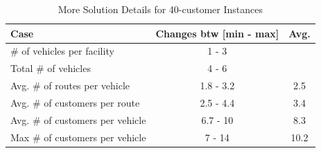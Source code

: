 \begin{table}[!htbp]
\centering
\caption{More Solution Details for 40-customer Instances}\label{SolDet2}
\begin {tabular}[!h]{|l|c|c|} \hline
Case                    &  Changes btw [min - max] & Avg. \\\hline
\# of vehicles per facility      & 1 - 3 &  \\
Total \# of vehicles              & 4 - 6 &  \\
Avg. \# of routes per vehicle    & 1.8 - 3.2 & 2.5 \\
Avg. \# of customers per route    & 2.5 - 4.4 & 3.4 \\
Avg. \# of customers per vehicle & 6.7 - 10 & 8.3 \\
Max \# of customers per vehicle  & 7 - 14 & 10.2 \\\hline
\end{tabular}
\end{table}

